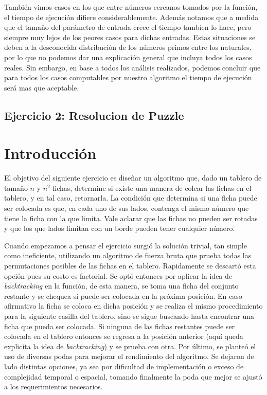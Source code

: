\documentclass[a4paper,10pt] {article}
\begin{document}
Tambi\'en vimos casos en los que entre n\'umeros cercanos tomados por la funci\'on, el tiempo de ejecuci\'on difiere considerablemente. Adem\'as notamos que a medida que el tama\~{n}o del par\'ametro de entrada crece el tiempo tamb\'ien lo hace, pero siempre muy lejos de los peores casos para dichas entradas. Estas situaciones se deben a la desconocida distribuci\'on de los n\'umeros primos entre los naturales, por lo que no podemos dar una explicaci\'on general que incluya todos los casos reales. Sin embargo, en base a todos los an\'alisis realizados, podemos concluir que para todos los casos computables por nuestro algoritmo el tiempo de ejecuci\'on ser\'a mas que aceptable.

\bigskip

\begin{center}
\section*{Ejercicio 2: Resolucion de Puzzle}
\end{center}

\bigskip
\section*{Introducci\'on}

El objetivo del siguiente ejercicio es diseñar un algoritmo que, dado un tablero de tama\~{n}o $n$ y $n^{2}$ fichas, determine si existe una manera de colcar las fichas en el tablero, y en tal caso, retornarla. La condici\'on que determina si una ficha puede ser colocada es que, en cada uno de sus lados, contenga el mismo n\'umero que tiene la ficha con la que limita. Vale aclarar que las fichas no pueden ser rotadas y que los que lados limitan con un borde pueden tener cualquier n\'umero.

Cuando empezamos a pensar el ejercicio surgi\'o la solución trivial, tan simple como ineficiente, utilizando un algoritmo de fuerza bruta que prueba todas las permutaciones posibles de las fichas en el tablero. Rapidamente se descart\'o esta opci\'on pues su costo es factorial. Se opt\'o entonces por aplicar la idea de \textit{backtracking} en la funci\'on, de esta manera, se toma una ficha del conjunto restante y se chequea si puede ser colocada en la pr\'oxima posici\'on. En caso afirmativo la ficha se coloca en dicha posici\'on y se realiza el mismo procedimiento para la siguiente casilla del tablero, sino se sigue buscando hasta encontrar una ficha que pueda ser colocada. Si ninguna de las fichas restantes puede ser colocada en el tablero entonces se regresa a la posici\'on anterior (aqu\'i queda explicita la idea de \textit{backtracking}) y se prueba con otra. Por \'ultimo, se plante\'o el uso de diversas podas para mejorar el rendimiento del algoritmo. Se dejaron de lado distintas opciones, ya sea por dificultad de implementaci\'on o exceso de complejidad temporal o espacial, tomando finalmente la poda que mejor se ajust\'o a los requerimientos necesarios.
\end{document}
